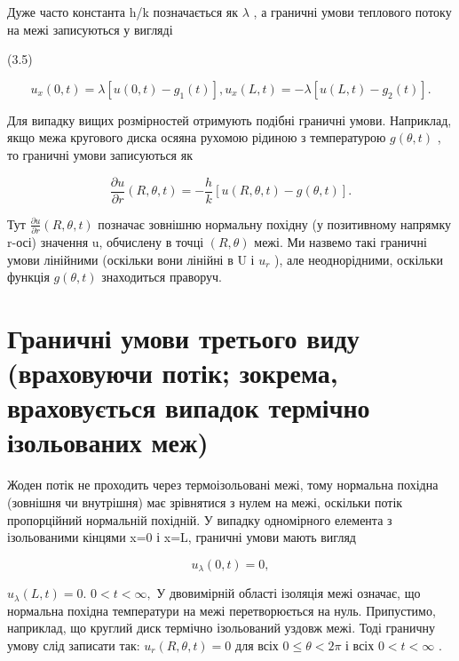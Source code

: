\documentclass[
  ukrainian,
]{article}
\begin{document}
Дуже часто константа h/k позначається як \(\lambda\) , а граничні умови
теплового потоку на межі записуються у вигляді

(3.5)

\[
u_{x}(0, t) = \lambda [u(0, t) - g_{1}(t)], u_{x}(L, t) = -\lambda [u(L, t) - g_{2}(t)].
\]

Для випадку вищих розмірностей отримують подібні граничні умови.
Наприклад, якщо межа кругового диска осяяна рухомою рідиною з
температурою \(g(\theta,t)\) , то граничні умови записуються як

\[
\frac{\partial u}{\partial r}(R, \theta, t) = -\frac{h}{k} [u(R, \theta, t) - g(\theta, t)].
\]

Тут \(\frac{\partial u}{\partial r}(R, \theta, t)\) позначає зовнішню
нормальну похідну (у позитивному напрямку r-осі) значення u, обчислену в
точці \((R, \theta)\) межі. Ми назвемо такі граничні умови лінійними
(оскільки вони лінійні в U і \(u_r\) ), але неоднорідними, оскільки
функція \(g(\theta, t)\) знаходиться праворуч.

\section{Граничні умови третього виду (враховуючи потік; зокрема,
враховується випадок термічно ізольованих
меж)}\label{ux433ux440ux430ux43dux438ux447ux43dux456-ux443ux43cux43eux432ux438-ux442ux440ux435ux442ux44cux43eux433ux43e-ux432ux438ux434ux443-ux432ux440ux430ux445ux43eux432ux443ux44eux447ux438-ux43fux43eux442ux456ux43a-ux437ux43eux43aux440ux435ux43cux430-ux432ux440ux430ux445ux43eux432ux443ux454ux442ux44cux441ux44f-ux432ux438ux43fux430ux434ux43eux43a-ux442ux435ux440ux43cux456ux447ux43dux43e-ux456ux437ux43eux43bux44cux43eux432ux430ux43dux438ux445-ux43cux435ux436}

Жоден потік не проходить через термоізольовані межі, тому нормальна
похідна (зовнішня чи внутрішня) має зрівнятися з нулем на межі, оскільки
потік пропорційний нормальній похідній. У випадку одномірного елемента з
ізольованими кінцями x=0 і x=L, граничні умови мають вигляд

\[
u_{\lambda}(0, t) = 0,
\]

\(u_{\lambda}(L, t) = 0.\) \(0 < t < \infty,\) У двовимірній області
ізоляція межі означає, що нормальна похідна температури на межі
перетворюється на нуль. Припустимо, наприклад, що круглий диск термічно
ізольований уздовж межі. Тоді граничну умову слід записати так:
\(u_r(R, \theta, t) = 0\) для всіх \(0 \le \theta < 2\pi\) і всіх
\(0 < t < \infty\) .
\end{document}
